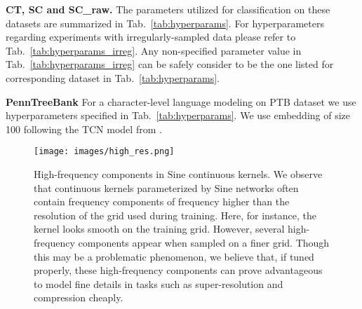 \documentclass{article}
\begin{document}
\textbf{CT, SC and SC\_raw.} The parameters utilized for classification on these datasets are summarized in Tab.~\ref{tab:hyperparams}. For hyperparameters regarding experiments with irregularly-sampled data please refer to Tab.~\ref{tab:hyperparams_irreg}. Any non-specified parameter value in Tab.~\ref{tab:hyperparams_irreg} can be safely consider to be the one listed for corresponding dataset in Tab.~\ref{tab:hyperparams}.

\textbf{PennTreeBank} For a character-level language modeling on PTB dataset we use hyperparameters specified in Tab.~\ref{tab:hyperparams}. We use embedding of size 100 following the TCN model from \cite{bai2018empirical}.

\begin{table}[t]
\centering
\caption{Hyperparameter values for experiments on irregularly sampled data. Non-listed parameters correspond to those in Tab.~\ref{tab:hyperparams}.}
\label{tab:hyperparams_irreg}
\begin{center}
\vskip -3mm
\begin{small}
\end{small}
\end{center}
\vspace{-5.0mm}
\end{table}

 \begin{figure}
     \centering
     \texttt{[image: images/high\_res.png]}
     \vspace{-2mm}
     \caption{High-frequency components in $\mathrm{Sine}$ continuous kernels. We observe that continuous kernels parameterized by Sine networks often contain frequency components of frequency higher than the resolution of the grid used during training. Here, for instance, the kernel looks smooth on the training grid. However, several high-frequency components appear when sampled on a finer grid. Though this may be a problematic phenomenon, we believe that, if tuned properly, these high-frequency components can prove advantageous to model fine details in tasks such as super-resolution and compression cheaply.
     \vspace{-4mm}}
     \label{fig:high_freq}
 \end{figure}
\end{document}
